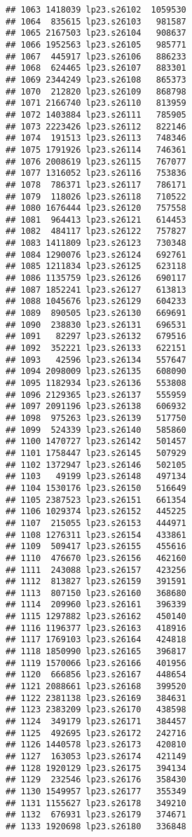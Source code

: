 \documentclass[
]{article}
\begin{document}
\begin{verbatim}
## 1063 1418039 lp23.s26102  1059530
## 1064  835615 lp23.s26103   981587
## 1065 2167503 lp23.s26104   908637
## 1066 1952563 lp23.s26105   985771
## 1067  445917 lp23.s26106   886233
## 1068  624465 lp23.s26107   883301
## 1069 2344249 lp23.s26108   865373
## 1070  212820 lp23.s26109   868798
## 1071 2166740 lp23.s26110   813959
## 1072 1403884 lp23.s26111   785905
## 1073 2223426 lp23.s26112   822146
## 1074  191513 lp23.s26113   748346
## 1075 1791926 lp23.s26114   746361
## 1076 2008619 lp23.s26115   767077
## 1077 1316052 lp23.s26116   753836
## 1078  786371 lp23.s26117   786171
## 1079  118026 lp23.s26118   710522
## 1080 1676444 lp23.s26120   757558
## 1081  964413 lp23.s26121   614453
## 1082  484117 lp23.s26122   757827
## 1083 1411809 lp23.s26123   730348
## 1084 1290076 lp23.s26124   692761
## 1085 1211834 lp23.s26125   623118
## 1086 1135759 lp23.s26126   690117
## 1087 1852241 lp23.s26127   613813
## 1088 1045676 lp23.s26129   604233
## 1089  890505 lp23.s26130   669691
## 1090  238830 lp23.s26131   696531
## 1091   82297 lp23.s26132   679516
## 1092  352221 lp23.s26133   622151
## 1093   42596 lp23.s26134   557647
## 1094 2098009 lp23.s26135   608090
## 1095 1182934 lp23.s26136   553808
## 1096 2129365 lp23.s26137   555959
## 1097 2091196 lp23.s26138   606932
## 1098  975263 lp23.s26139   517750
## 1099  524339 lp23.s26140   585860
## 1100 1470727 lp23.s26142   501457
## 1101 1758447 lp23.s26145   507929
## 1102 1372947 lp23.s26146   502105
## 1103   49199 lp23.s26148   497134
## 1104 1530176 lp23.s26150   516649
## 1105 2387523 lp23.s26151   661354
## 1106 1029374 lp23.s26152   445225
## 1107  215055 lp23.s26153   444971
## 1108 1276311 lp23.s26154   433861
## 1109  509417 lp23.s26155   455616
## 1110  476670 lp23.s26156   462160
## 1111  243088 lp23.s26157   423256
## 1112  813827 lp23.s26159   391591
## 1113  807150 lp23.s26160   368680
## 1114  209960 lp23.s26161   396339
## 1115 1297882 lp23.s26162   450140
## 1116 1196377 lp23.s26163   418916
## 1117 1769103 lp23.s26164   424818
## 1118 1850990 lp23.s26165   396817
## 1119 1570066 lp23.s26166   401956
## 1120  666856 lp23.s26167   448654
## 1121 2088661 lp23.s26168   399520
## 1122 2381138 lp23.s26169   384631
## 1123 2383209 lp23.s26170   438598
## 1124  349179 lp23.s26171   384457
## 1125  492695 lp23.s26172   242716
## 1126 1440578 lp23.s26173   420810
## 1127  163053 lp23.s26174   421149
## 1128 1920129 lp23.s26175   394134
## 1129  232546 lp23.s26176   358430
## 1130 1549957 lp23.s26177   355349
## 1131 1155627 lp23.s26178   349210
## 1132  676931 lp23.s26179   374671
## 1133 1920698 lp23.s26180   336848

\end{verbatim}
\end{document}
